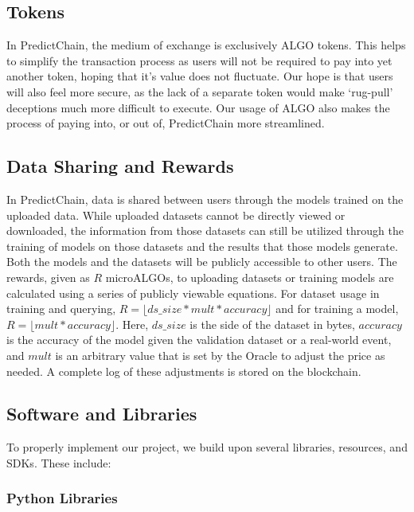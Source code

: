 \documentclass{ledger}
\begin{document}
\subsection{Tokens}

In PredictChain, the medium of exchange is exclusively ALGO tokens.  This helps to simplify the transaction process as
users will not be required to pay into yet another token, hoping that it's value does not fluctuate.  Our hope is that
users will also feel more secure, as the lack of a separate token would make `rug-pull' deceptions much more difficult to
execute. Our usage of ALGO also makes the process of paying into, or out of, PredictChain more streamlined.

\subsection{Data Sharing and Rewards}

In PredictChain, data is shared between users through the models trained on the uploaded data.  While uploaded datasets
cannot be directly viewed or downloaded, the information from those datasets can still be utilized through the training
of models on those datasets and the results that those models generate.  Both the models and the datasets will be publicly
accessible to other users.  The rewards, given as $R$ microALGOs, to uploading datasets or training models are calculated
using a series of publicly viewable equations.  For dataset usage in training and querying, $R = \lfloor ds\_size * mult * accuracy \rfloor$
and for training a model, $R = \lfloor mult * accuracy \rfloor$.  Here, $ds\_size$ is the side of the dataset in bytes,
$accuracy$ is the accuracy of the model given the validation dataset or a real-world event, and $mult$ is an arbitrary value
that is set by the Oracle to adjust the price as needed.  A complete log of these adjustments is stored on the blockchain.

\subsection{Software and Libraries}

To properly implement our project, we build upon several libraries, resources, and SDKs.  These include:

\subsubsection{Python Libraries}
\end{document}
